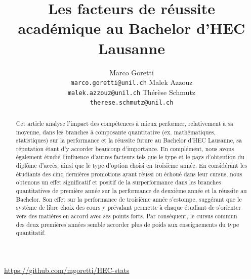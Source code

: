 \documentclass[10pt]{article} %
\title{Les facteurs de réussite académique au Bachelor d'HEC Lausanne }
\author{
Marco Goretti \\
\texttt{marco.goretti@unil.ch}
\And
Malek Azzouz \\
\texttt{malek.azzouz@unil.ch}
\And
Thérèse Schmutz \\
\texttt{therese.schmutz@unil.ch}
}
\begin{document}
\maketitle
\thispagestyle{empty}
\begin{abstract}

Cet article analyse l'impact des compétences à mieux performer, relativement à sa moyenne, dans les branches à composante quantitative (ex. mathématiques, statistiques) sur la performance et la réussite future au Bachelor d'HEC Lausanne, sa réputation étant d'y accorder beaucoup d'importance. En complément, nous avons également étudié l'influence d'autres facteurs tels que le type et le pays d'obtention du diplôme d'accès, ainsi que le type d'option choisi en troisième année. En considérant les étudiants des cinq dernières promotions ayant réussi ou échoué dans leur cursus, nous obtenons un effet significatif et positif de la surperformance dans les branches quantitatives de première année sur la performance de deuxième année et la réussite au Bachelor. Son effet sur la performance de troisième année s'estompe, suggérant que le système de libre choix des cours y prévalant permette à chaque étudiant de s'orienter vers des matières en accord avec ses points forts. Par conséquent, le cursus commun des deux premières années semble accorder plus de poids aux enseignements du type quantitatif.

\end{abstract}

\vfill

\begin{center}
\url{https://github.com/mgoretti/HEC-stats}
\end{center}

\newpage
\setcounter{page}{1}
\end{document}
